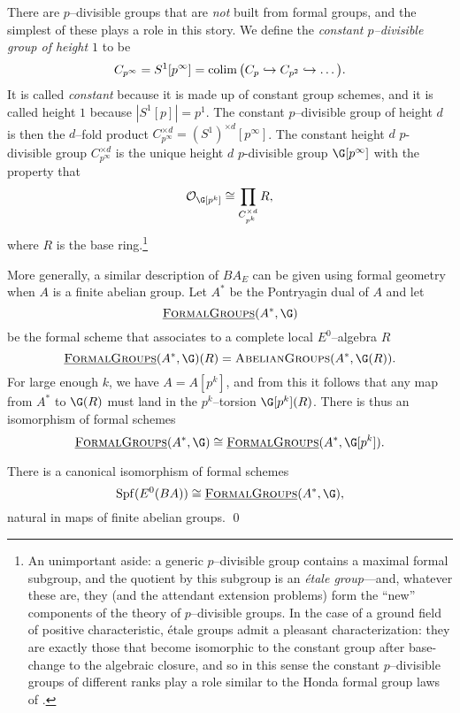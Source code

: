 There are \(p\)--divisible groups that are \emph{not} built from formal groups, and the simplest of these plays a role in this story.  We define the \textit{constant \(p\)--divisible group of height \(1\)} to be 
\[
C_{p^{\infty}} = S^1[p^\infty] = \operatorname*{colim} \big ( C_p \hookrightarrow C_{p^2} \hookrightarrow \ldots \big ).
\]
It is called \textit{constant} because it is made up of constant group schemes, and it is called height \(1\) because \(|S^1[p]| = p^1\).  The constant \(p\)--divisible group of height \(d\) is then the \(d\)--fold product \(C_{p^\infty}^{\times d} = (S^1)^{\times d}[p^\infty]\). The constant height \(d\) \(p\)-divisible group \(C_{p^\infty}^{\times d}\) is the unique height \(d\) \(p\)-divisible group $\G[p^{\infty}]$ with the property that
\[
\sheaf O_{\G[p^k]} \cong \prod_{C_{p^k}^{\times d}}R,
\]
where $R$ is the base ring.\footnote{An unimportant aside: a generic \(p\)--divisible group contains a maximal formal subgroup, and the quotient by this subgroup is an \textit{\'etale group}---and, whatever these are, they (and the attendant extension problems) form the ``new'' components of the theory of \(p\)--divisible groups.  In the case of a ground field of positive characteristic, \'etale groups admit a pleasant characterization: they are exactly those that become isomorphic to the constant group after base-change to the algebraic closure, and so in this sense the constant \(p\)--divisible groups of different ranks play a role similar to the Honda formal group laws of .}


More generally, a similar description of \(BA_{E}\) can be given using formal geometry when \(A\) is a finite abelian group. Let \(A^*\) be the Pontryagin dual of \(A\) and let
\[
\InternalHom{FormalGroups}(A^*, \G)
\]
be the formal scheme that associates to a complete local \(E^0\)--algebra \(R\)
\[
\InternalHom{FormalGroups}(A^*, \G)(R) = \CatOf{AbelianGroups}(A^*, \G(R)).
\]
For large enough \(k\), we have \(A = A[p^k]\), and from this it follows that any map from \(A^*\) to \(\G(R)\) must land in the \(p^k\)--torsion \(\G[p^k](R)\).  There is thus an isomorphism of formal schemes
\[
\InternalHom{FormalGroups}(A^*, \G) \cong \InternalHom{FormalGroups}(A^*, \G[p^k]).
\]
\begin{proposition} \label{app:abeliangroupdualhom}
There is a canonical isomorphism of formal schemes
\[
\Spf(E^0(BA)) \cong \InternalHom{FormalGroups}(A^*, \G),
\]
natural in maps of finite abelian groups. \qed
\end{proposition}


